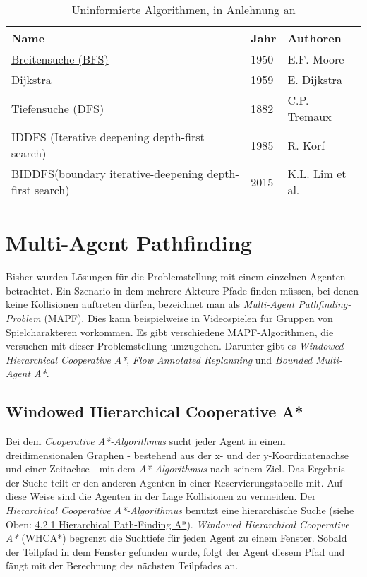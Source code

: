 \begin{table}[h]
	\begin{tabular}[h]{L{8cm}|C{1cm}|L{5cm}}
		\hline
		\textbf{Name}                                                    & \textbf{Jahr} & \textbf{Authoren}        \\ \hline
		\hyperref[sec:bfs]{Breitensuche (BFS)}                                      & 1950 & E.F. Moore      \\ \hline
		\hyperref[sec:dijkstra]{Dijkstra}                                                & 1959 & E. Dijkstra     \\ \hline
		\hyperref[sec:dfs]{Tiefensuche (DFS)}                                       & 1882 & C.P. Tremaux    \\ \hline
		IDDFS (Iterative deepening depth-first search)          & 1985 & R. Korf         \\ \hline
		BIDDFS(boundary iterative-deepening depth-first search) & 2015 & K.L. Lim et al. \\ \hline
	\end{tabular}
	\caption{\label{tab:uninformed}Uninformierte Algorithmen, in Anlehnung an \cite[S.233]{Noo15}}
\end{table}



\section{Multi-Agent Pathfinding}
Bisher wurden Lösungen für die Problemstellung mit einem einzelnen Agenten betrachtet. Ein Szenario in dem mehrere Akteure Pfade finden müssen, bei denen keine Kollisionen auftreten dürfen, bezeichnet man als \textit{Multi-Agent Pathfinding-Problem} (MAPF). Dies kann beispielweise in Videospielen für Gruppen von Spielcharakteren vorkommen. Es gibt verschiedene MAPF-Algorithmen, die versuchen mit dieser Problemstellung umzugehen. Darunter gibt es \textit{Windowed Hierarchical Cooperative A*}, \textit{Flow Annotated Replanning} und \textit{Bounded Multi-Agent A*}.

\subsection{Windowed Hierarchical Cooperative A*}
Bei dem \textit{Cooperative A*-Algorithmus} sucht jeder Agent in einem dreidimensionalen Graphen - bestehend aus der x- und der y-Koordinatenachse und einer Zeitachse - mit dem \textit{A*-Algorithmus} nach seinem Ziel. 
Das Ergebnis der Suche teilt er den anderen Agenten in einer Reservierungstabelle mit. Auf diese Weise sind die Agenten in der Lage Kollisionen zu vermeiden. 
Der \textit{Hierarchical Cooperative A*-Algorithmus} benutzt eine hierarchische Suche (siehe Oben: \hyperref[sec:hpa]{4.2.1 Hierarchical Path-Finding A*}). \textit{Windowed Hierarchical Cooperative A*} (WHCA*) begrenzt die Suchtiefe für jeden Agent zu einem Fenster. Sobald der Teilpfad in dem Fenster gefunden wurde, folgt der Agent diesem Pfad und fängt mit der Berechnung des nächsten Teilpfades an.
